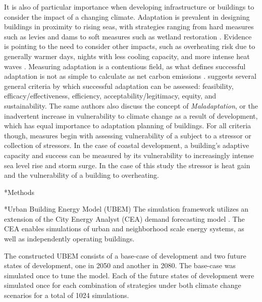 \documentclass[twocolumn, a4paper,10pt]{article}
\makeatletter
\renewcommand\section{\@startsection{section}{1}{\z@}{3pt}{3pt}{\normalfont\large\bfseries}}
\renewcommand\subsection{\@startsection{subsection}{1}{\z@}{\z@}{\z@}{\normalfont\normalsize\bfseries}}
\renewcommand\subsection{\@startsection{subsection}{1}{\z@}{\z@}{0.1pt}{\normalfont\normalsize\bfseries}}
\makeatother
\begin{document}
It is also of particular importance when developing infrastructure or buildings to consider the impact of a changing climate. Adaptation is prevalent in designing buildings in proximity to rising seas, with strategies ranging from hard measures such as levies and dams to soft measures such as wetland restoration \citep{pachauri_climate_2015}. Evidence is pointing to the need to consider other impacts, such as overheating risk due to generally warmer days, nights with less cooling capacity, and more intense heat waves \citep{lomas_overheating_2017,rysanek_forecasting_2021}. Measuring adaptation is a contentious field, as what defines successful adaptation is not as simple to calculate as net carbon emissions \citep{pachauri_climate_2015}. \citet{brooks_tracking_2011} suggests several general criteria by which successful adaptation can be assessed: feasibility, efficacy/effectiveness, efficiency, acceptability/legitimacy, equity, and sustainability. The same authors also discuss the concept of \textit{Maladaptation}, or the inadvertent increase in vulnerability to climate change as a result of development, which has equal importance to adaptation planning of buildings. For all criteria though, measures begin with assessing vulnerability of a subject to a stressor or collection of stressors. In the case of coastal development, a building's adaptive capacity and success can be measured by its vulnerability to increasingly intense sea level rise and storm surge. In the case of this study the stressor is heat gain and the vulnerability of a building to overheating. 

\section*{Methods}

\subsection*{Urban Building Energy Model (UBEM)}
The simulation framework utilizes an extension of the City Energy Analyst (CEA) demand forecasting model \citep{fonseca_city_2016,the_cea_team_city_2020}. The CEA enables simulations of urban and neighborhood scale energy systems, as well as independently operating buildings. 

The constructed UBEM consists of a base-case of development and two future states of development, one in 2050 and another in 2080. The base-case was simulated once to tune the model. Each of the future states of development were simulated once for each combination of strategies under both climate change scenarios for a total of 1024 simulations.  
\end{document}
